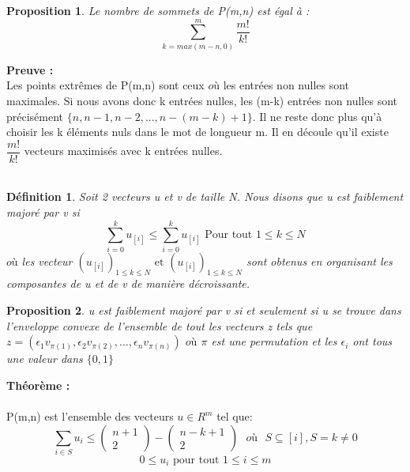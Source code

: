 \documentclass{book}
\newtheorem{petit_nom1}{Proposition}
\newtheorem{petit_nom2}{Définition}[chapter]
\begin{document}
\begin{petit_nom1}
Le nombre de sommets de P(m,n) est égal à :
\begin{equation}
\sum_{k=max(m-n,0)}^m \dfrac{m!}{k!} 
\end{equation}
\end{petit_nom1}
\textbf{Preuve : }\\
Les points extrêmes de P(m,n) sont ceux $où$ les entrées non nulles sont maximales. Si nous avons donc k entrées nulles, les (m-k) entrées non nulles sont précisément $ \{n,n-1,n-2,...,n-(m-k)+1 \} $. Il ne reste donc plus qu'à choisir les k éléments nuls dans le mot de longueur m. Il en découle qu'il existe $\dfrac{m!}{k!}$ vecteurs maximisés avec k entrées nulles.\\\\
\begin{petit_nom2}
Soit 2 vecteurs u et v de taille N. Nous disons que u est faiblement majoré par v si 
\begin{equation}
\sum_{i=0}^k u_{[i]} \leqslant \sum_{i=0}^k u_{[i]}  \text{           Pour tout } 1\leqslant k  \leqslant N
\end{equation}
$où$ les vecteur $ (u_{[i]})_{1\leqslant k  \leqslant N} \text{ et } (u_{[i]})_{1\leqslant k  \leqslant N} $ sont obtenus en organisant les composantes de u et de v de manière décroissante. 
\end{petit_nom2}
\begin{petit_nom1}
u est faiblement majoré par v si et seulement si u se trouve dans l'enveloppe convexe de l'ensemble de tout les vecteurs z tels que $z= (\epsilon_1v_{\pi(1)},\epsilon_2v_{\pi(2)},...,\epsilon_nv_{\pi(n)})$ $où$ $\pi$ est une permutation et les $\epsilon_i$ ont tous une valeur dans $\{0,1\}$
\end{petit_nom1}
\textbf{Théorème :} \\\\
P(m,n) est l'ensemble des vecteurs $u \in R^m$ tel que:
\begin{equation}
\sum_{i \in S} u_i \leqslant \begin{pmatrix}
n+1\\2
\end{pmatrix}-\begin{pmatrix}
n-k+1\\2
\end{pmatrix}
\text{           $où$ } S  \subseteq [i] , S=k \neq 0
\end{equation}
\begin{equation}
0 \leqslant u_i  \text{           pour tout  } 1\leqslant i\leqslant m
\end{equation}
\end{document}
